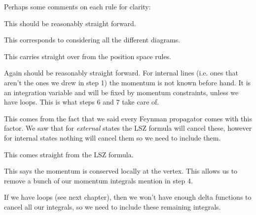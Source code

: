 Perhaps some comments on each rule for clarity: 
\ben
    \item This should be reasonably straight forward.
    \item This corresponds to considering all the different diagrams. 
    \item This carries straight over from the position space rules. 
    \item Again should be reasonably straight forward. For internal lines (i.e. ones that aren't the ones we drew in step 1) the momentum is not known before hand. It is an integration variable and will be fixed by momentum constraints, unless we have loops. This is what steps $6$ and $7$ take care of. 
    \item This comes from the fact that we said every Feynman propagator comes with this factor. We saw that for \textit{external} states the LSZ formula will cancel these, however for internal states nothing will cancel them so we need to include them. 
    \item This comes straight from the LSZ formula. 
    \item This says the momentum is conserved locally at the vertex. This allows us to remove a bunch of our momentum integrals mention in step 4. 
    \item If we have loops (see next chapter), then we won't have enough delta functions to cancel all our integrals, so we need to include these remaining integrals. 
\een 